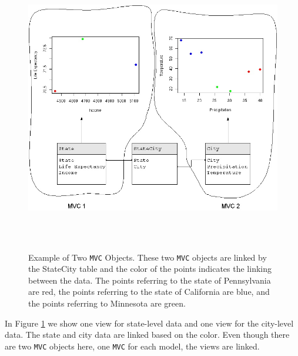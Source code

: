 \documentclass[11pt]{article}
\newcommand{\Robject}[1]{{\texttt{#1}}}
\begin{document}
\begin{figure}[ht]
  \begin{center}
    \includegraphics[height=5in, width=6in]{MultipleMVC.jpg}
    \caption{ Example of Two \Robject{MVC} Objects.  These two \Robject{MVC}
      objects are linked by the StateCity table and the color of the points
    indicates the linking between the data.  The points referring to the state
    of Pennsylvania are red, the points referring to the state of California
    are blue, and the points referring to Minnesota are green. }
    \label{Fig:MultMVC}
  \end{center}
\end{figure}

In Figure \ref{Fig:MultMVC} we show one view for state-level data and
one view for the city-level data.  The state and city data are linked
based on the color.  Even though there are two \Robject{MVC} objects
here, one \Robject{MVC} for each model, the views are linked.

\end{document}
